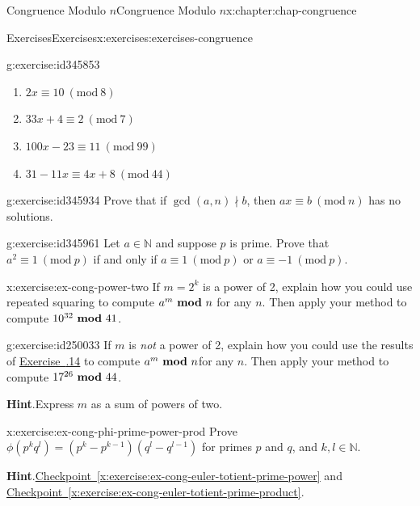 \documentclass[oneside,10pt,]{book}
\newcommand{\blocktitlefont}{\relax}
\newcommand{\xreffont}{\relax}
\numberwithin{equation}{section}
\newcommand{\Mod}[1]{\ \left(\mathrm{mod}\ #1\right)}
\newcommand{\mmod}[1]{\ \mathrm{\bf mod}\ #1}
\begin{document}
\begin{chapterptx}{Congruence Modulo \(n\)}{}{Congruence Modulo \(n\)}{}{}{x:chapter:chap-congruence}
\begin{exercises-section}{Exercises}{}{Exercises}{}{}{x:exercises:exercises-congruence}
\begin{divisionexercise}{11}{}{}{g:exercise:id345853}
\begin{enumerate}[label=(\alph*)]
\item{}\(\displaystyle 2x \equiv 10 \Mod{8}\)%
\item{}\(\displaystyle 33x + 4 \equiv 2 \Mod{7}\)%
\item{}\(\displaystyle 100x - 23 \equiv 11 \Mod{99}\)%
\item{}\(\displaystyle 31 - 11x \equiv 4x + 8 \Mod{44}\)%
\end{enumerate}
%
\end{divisionexercise}%
\begin{divisionexercise}{12}{}{}{g:exercise:id345934}%
Prove that if \(\gcd(a,n) \nmid b\), then \(ax \equiv b \Mod{n}\) has no solutions.%
\end{divisionexercise}%
\begin{divisionexercise}{13}{}{}{g:exercise:id345961}%
Let \(a \in \mathbb{N}\) and suppose \(p\) is prime. Prove that \(a^2 \equiv 1 \Mod{p}\) if and only if \(a \equiv 1 \Mod{p}\) or \(a \equiv -1 \Mod{p}\).%
\end{divisionexercise}%
\begin{divisionexercise}{14}{}{}{x:exercise:ex-cong-power-two}%
If \(m = 2^k\) is a power of 2, explain how you could use repeated squaring to compute \(a^m \mmod{n}\) for any \(n\). Then apply your method to compute \(10^{32} \mmod 41\).%
\end{divisionexercise}%
\begin{divisionexercise}{15}{}{}{g:exercise:id250033}%
If \(m\) is \emph{not} a power of 2, explain how you could use the results of \hyperlink{x:exercise:ex-cong-power-two}{Exercise~{\xreffont 4.6.14}} to compute \(a^m \mmod{n}\)for any \(n\). Then apply your method to compute \(17^{26} \mmod 44\).%
\par\smallskip%
\noindent\textbf{\blocktitlefont Hint}.\hypertarget{g:hint:id250257}{}\quad{}Express \(m\) as a sum of powers of two.%
\end{divisionexercise}%
\begin{divisionexercise}{16}{}{}{x:exercise:ex-cong-phi-prime-power-prod}%
Prove \(\phi(p^kq^l) = \left(p^k-p^{k-1}\right)\left(q^l - q^{l-1}\right)\) for primes \(p\) and \(q\), and \(k,l\in\mathbb{N}\).%
\par\smallskip%
\noindent\textbf{\blocktitlefont Hint}.\hypertarget{g:hint:id248556}{}\quad{}\hyperref[x:exercise:ex-cong-euler-totient-prime-power]{Checkpoint~{\xreffont\ref{x:exercise:ex-cong-euler-totient-prime-power}}} and \hyperref[x:exercise:ex-cong-euler-totient-prime-product]{Checkpoint~{\xreffont\ref{x:exercise:ex-cong-euler-totient-prime-product}}}.%

\end{divisionexercise}
\end{exercises-section}
\end{chapterptx}
\end{document}
